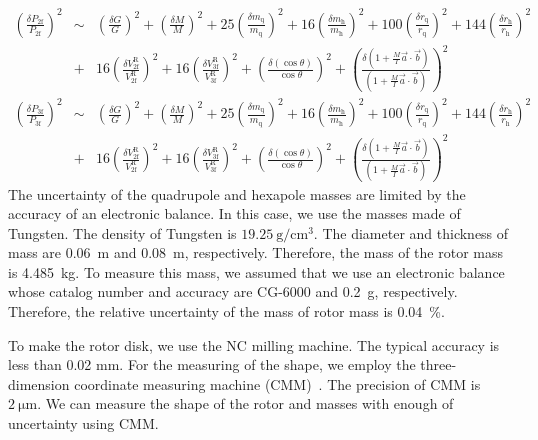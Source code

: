 \documentclass[A4]{spie}  %
\begin{document}
\begin{eqnarray}
\left( \frac{\delta P_{\mathrm{2f}}}{P_{\mathrm{2f}}} \right)^2 &\sim& \left( \frac{\delta G}{G} \right)^2 + \left( \frac{\delta M}{M} \right)^2+25\left( \frac{\delta m_{\mathrm{q}}}{m_{\mathrm{q}}} \right)^2+16\left( \frac{\delta m_{\mathrm{h}}}{m_{\mathrm{h}}} \right)^2 +100\left( \frac{\delta r_{\mathrm{q}}}{r_{\mathrm{q}}} \right)^2+144\left( \frac{\delta r_{\mathrm{h}}}{r_{\mathrm{h}}} \right)^2 \nonumber \\
&+&16\left( \frac{\delta V^{\mathrm{R}}_{{\mathrm{2f}}}}{V^{\mathrm{R}}_{{\mathrm{2f}}}} \right)^2+16\left( \frac{\delta V^{\mathrm{R}}_{{\mathrm{3f}}}}{V^{\mathrm{R}}_{{\mathrm{3f}}}} \right)^2+\left( \frac{\delta (\cos{\theta})}{\cos{\theta}} \right)^2+ \left( \frac{\delta\left( 1+\frac{M}{I}\vec{a}\cdot \vec{b} \right)}{\left( 1+\frac{M}{I}\vec{a}\cdot \vec{b} \right)} \right)^2 \\
\left( \frac{\delta P_{\mathrm{3f}}}{P_{\mathrm{3f}}} \right)^2 &\sim& \left( \frac{\delta G}{G} \right)^2 + \left( \frac{\delta M}{M} \right)^2+25\left( \frac{\delta m_{\mathrm{q}}}{m_{\mathrm{q}}} \right)^2+16\left( \frac{\delta m_{\mathrm{h}}}{m_{\mathrm{h}}} \right)^2 +100\left( \frac{\delta r_{\mathrm{q}}}{r_{\mathrm{q}}} \right)^2+144\left( \frac{\delta r_{\mathrm{h}}}{r_{\mathrm{h}}} \right)^2 \nonumber \\
&+&16\left( \frac{\delta V^{\mathrm{R}}_{{\mathrm{2f}}}}{V^{\mathrm{R}}_{{\mathrm{2f}}}} \right)^2+16\left( \frac{\delta V^{\mathrm{R}}_{{\mathrm{3f}}}}{V^{\mathrm{R}}_{{\mathrm{3f}}}} \right)^2+\left( \frac{\delta (\cos{\theta})}{\cos{\theta}} \right)^2+ \left( \frac{\delta\left( 1+\frac{M}{I}\vec{a}\cdot \vec{b} \right)}{\left( 1+\frac{M}{I}\vec{a}\cdot \vec{b} \right)} \right)^2 
\end{eqnarray}
The uncertainty of the quadrupole and hexapole masses are limited by the accuracy of  an electronic balance. In this case, we use the masses made of Tungsten. The density of Tungsten is $19.25~\mathrm{g/cm^3}$. The diameter and thickness of mass are 0.06~m and 0.08~m, respectively. Therefore, the mass of the rotor mass is 4.485~kg. To measure this mass, we assumed that we use an electronic balance whose catalog number and accuracy are CG-6000 and 0.2~g, respectively. Therefore, the relative uncertainty of the mass of rotor mass is 0.04~\%.

 To make the rotor disk, we use the NC milling machine. The typical accuracy is less than 0.02 mm. For the measuring of the shape, we employ the three-dimension coordinate measuring machine (CMM)~\cite{Inoue:2016kyq}. The precision of CMM is $2~\mathrm{\mu m}$. We can measure the shape of the rotor and masses with enough of uncertainty using CMM. 
\end{document}
